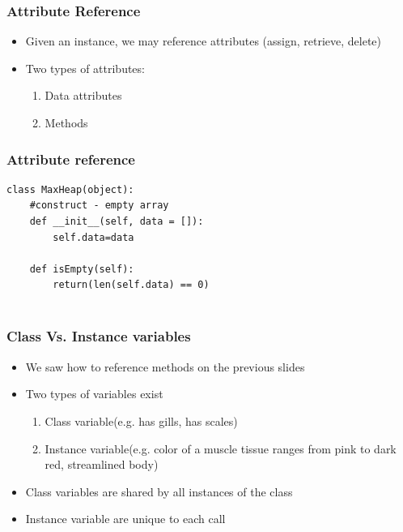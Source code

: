 \documentclass{beamer}
\begin{document}
\begin{frame}
\frametitle{Attribute Reference}

\begin{itemize}
\item Given an instance, we may reference attributes (assign, retrieve, delete)
\item Two types of attributes:
\begin{enumerate}
\item Data attributes
\item Methods
\end{enumerate}

\end{itemize}


\end{frame}



\begin{frame}[fragile]
\frametitle{Attribute reference}



\begin{Verbatim}
class MaxHeap(object):
	#construct - empty array
	def __init__(self, data = []):
		self.data=data
	
	def isEmpty(self):
		return(len(self.data) == 0)
		
\end{Verbatim}


\end{frame}



\begin{frame}
\frametitle{Class Vs. Instance variables}

\begin{itemize}
\item We saw how to reference methods on the previous slides
\item Two types of variables exist
\pause
\begin{enumerate}
\item Class variable(e.g. has gills, has scales) \pause
\item Instance variable(e.g. color of a muscle tissue ranges from pink to dark red, streamlined body)
\end{enumerate}
\pause
\item Class variables are shared by all instances of the class
\item Instance variable are unique to each call
\end{itemize}




\end{frame}
\end{document}
